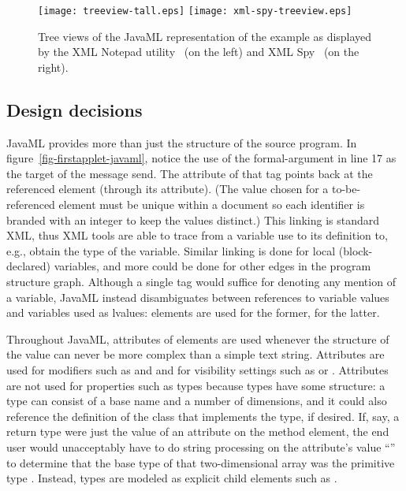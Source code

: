 \documentclass{article}
\begin{document}
\begin{multicols}{2}
\begin{figure}[p]
\begin{centering}
\texttt{[image: treeview-tall.eps]}
\hspace*{.5in}
\texttt{[image: xml-spy-treeview.eps]}
\caption{Tree views of the JavaML representation 
of the  example as displayed by the 
XML Notepad utility~\cite{XMLNotepad} (on the left) and XML Spy~\cite{XMLSpy} (on the 
right).
\label{fig-treeview}}
\end{centering}
\end{figure}

\subsection{Design decisions}
\label{ssec-design}

JavaML provides more than just the structure of the source program.
In figure~\ref{fig-firstapplet-javaml}, notice the use of the formal-argument
 in line 17 as the target of the message send.  The
 attribute of that  tag points back at
the referenced  element (through its
 attribute).  (The  value chosen for a
to-be-referenced element must be unique within a document so each
identifier is branded with an integer to keep the values distinct.)
This linking is standard XML, thus XML tools are able to trace from a
variable use to its definition to, e.g., obtain the type of the
variable.  Similar linking is done for local (block-declared) variables, 
and more could be done for other edges in the program structure graph.
Although a single  tag would suffice for denoting any
mention of a variable, JavaML instead disambiguates between references to
variable values and variables used as lvalues: 
elements are used for the former,  for the latter.

Throughout JavaML, attributes of elements are used whenever the
structure of the value can never be more complex than a simple text
string.  Attributes are used for modifiers such as
 and  and for visibility settings
such as  or .  Attributes are not
used for properties such as types because types have some structure: a
type can consist of a base name and a number of dimensions, and it could
also reference the definition of the class that implements the type, if
desired.  If, say, a return type were just the value of an attribute on
the method element, the end user would unacceptably have to do string
processing on the attribute's value ``'' to determine
that the base type of that two-dimensional array was the primitive type
.  Instead, types are modeled as explicit child elements
such as .


\end{multicols}
\end{document}

